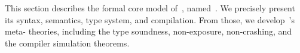 


This section describes the formal core model of~\systemname,
named~\lang.
We precisely present its syntax, semantics, type
system, and compilation.
% 
From those, we develop~\lang’s meta-
theories, including the type soundness, non-exposure, non-crashing,
and the compiler simulation theorems.

